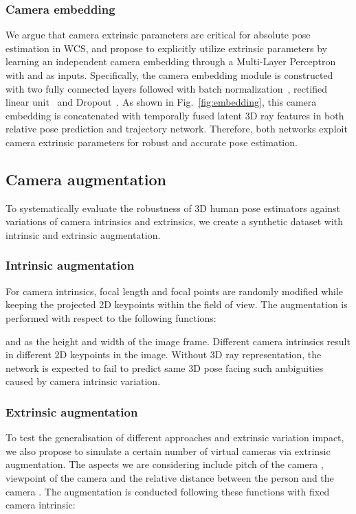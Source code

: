 \documentclass[10pt,twocolumn,letterpaper]{article}
\begin{document}
\subsubsection*{Camera embedding} 
\label{subsec: embedding}
We argue that camera extrinsic parameters are critical for absolute pose estimation in WCS, and propose to explicitly utilize extrinsic parameters by learning an independent camera embedding through a Multi-Layer Perceptron with  and  as inputs. Specifically, the camera embedding module is constructed with two fully connected layers followed with batch normalization~\cite{IoffeS15}, rectified linear unit~\cite{NairH10} and Dropout~\cite{SrivastavaHKSS14}. As shown in Fig.~\ref{fig:embedding}, this camera embedding is concatenated with temporally fused latent 3D ray features in both relative pose prediction and trajectory network. Therefore, both networks exploit camera extrinsic parameters for robust and accurate pose estimation.

\iffalse
\subsection{Camera augmentation}
\label{sec:augmentation}
To systematically evaluate the robustness of 3D human pose estimators against variations of camera intrinsics and extrinsics, we create a synthetic dataset with intrinsic and extrinsic augmentation. 
\subsubsection*{Intrinsic augmentation} 
\label{subsec: intrinsci_aug}
For camera intrinsics, focal length and focal points are randomly modified while keeping the projected 2D keypoints within the field of view. The augmentation is performed with respect to the following functions:


 and  as the height and width of the image frame. Different camera intrinsics result in different 2D keypoints in the image. Without 3D ray representation, the network is expected to fail to predict same 3D pose facing such ambiguities caused by camera intrinsic variation.

\subsubsection*{Extrinsic augmentation} 
\label{subsec: extrinsci_aug}
To test the generalisation of different approaches and extrinsic variation impact, we also propose to simulate a certain number of virtual cameras via extrinsic augmentation. The aspects we are considering include pitch of the camera , viewpoint of the camera  and the relative distance between the person and the camera . The augmentation is conducted following these functions with fixed camera intrinsic:  
\end{document}
